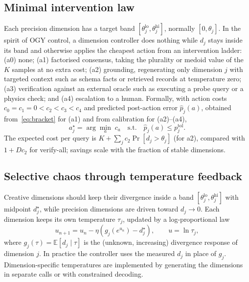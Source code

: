 \documentclass[preprint,12pt]{elsarticle}
\begin{document}
\subsection{Minimal intervention law}
Each precision dimension has a target band $[\theta^{\mathrm{lo}}_j,\theta^{\mathrm{hi}}_j]$, normally $[0,\theta_j]$. In the spirit of OGY control, a dimension controller does nothing while $d_j$ stays inside its band and otherwise applies the cheapest action from an intervention ladder: (a0) none; (a1) factorised consensus, taking the plurality or medoid value of the $K$ samples at no extra cost; (a2) grounding, regenerating only dimension $j$ with targeted context such as schema facts or retrieved records at temperature zero; (a3) verification against an external oracle such as executing a probe query or a physics check; and (a4) escalation to a human. Formally, with action costs $c_0=c_1=0<c_2<c_3<c_4$ and predicted post-action error $\hat p_j(a)$, obtained from~\eqref{eq:bracket} for (a1) and from calibration for (a2)--(a4),
\begin{equation}
a_j^\star=\arg\min_{a}\;c_a\quad\text{s.t.}\quad \hat p_j(a)\le p^{\mathrm{tol}}_j .
\label{eq:ladder}
\end{equation}
The expected cost per query is $K+\sum_j c_2\Pr[d_j>\theta_j]$ (for a2), compared with $1+Dc_2$ for verify-all; savings scale with the fraction of stable dimensions.

\subsection{Selective chaos through temperature feedback}
Creative dimensions should keep their divergence inside a band $[\theta^{\mathrm{lo}}_j,\theta^{\mathrm{hi}}_j]$ with midpoint $d^\star_j$, while precision dimensions are driven toward $d_j\to0$. Each dimension keeps its own temperature $\tau_j$, updated by a log-proportional law
\begin{equation}
u_{n+1}=u_n-\eta\left(g_j\!\left(e^{u_n}\right)-d_j^\star\right),\qquad u=\ln\tau_j,
\label{eq:temp}
\end{equation}
where $g_j(\tau)=\mathbb{E}[d_j\mid\tau]$ is the (unknown, increasing) divergence response of dimension $j$. In practice the controller uses the measured $d_j$ in place of $g_j$. Dimension-specific temperatures are implemented by generating the dimensions in separate calls or with constrained decoding.
\end{document}
